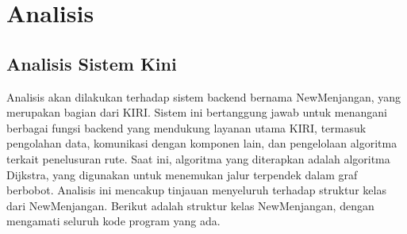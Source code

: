 \chapter{Analisis}
\label{chap:analisis}

\section{Analisis Sistem Kini}
\label{sec:sistemkini}
Analisis akan dilakukan terhadap sistem backend bernama NewMenjangan, yang merupakan bagian dari KIRI. Sistem ini bertanggung jawab untuk menangani berbagai fungsi backend yang mendukung layanan utama KIRI, termasuk pengolahan data, komunikasi dengan komponen lain, dan pengelolaan algoritma terkait penelusuran rute. Saat ini, algoritma yang diterapkan adalah algoritma Dijkstra, yang digunakan untuk menemukan jalur terpendek dalam graf berbobot. Analisis ini mencakup tinjauan menyeluruh terhadap struktur kelas dari NewMenjangan. Berikut adalah struktur kelas NewMenjangan, dengan mengamati seluruh kode program yang ada.
